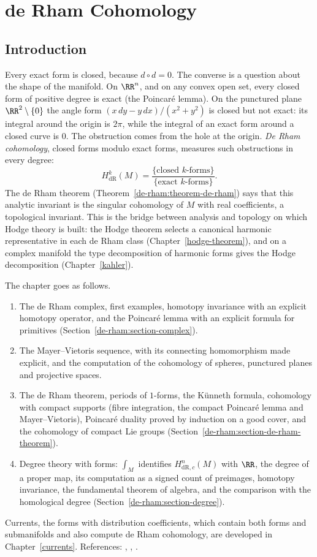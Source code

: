 \chapter{de Rham Cohomology}\label{de-rham}

\section{Introduction}\label{de-rham:section-introduction}

Every exact form is closed, because $d \circ d = 0$. The converse is a question about the shape of the manifold. On $\RR^n$, and on any convex open set, every closed form of
positive degree is exact (the Poincar\'e lemma). On the punctured plane $\RR^2 \setminus \{0\}$ the angle form $(x\,dy - y\,dx)/(x^2 + y^2)$ is closed but not exact: its integral
around the origin is $2\pi$, while the integral of an exact form around a closed curve is $0$. The obstruction comes from the hole at the origin. \emph{De Rham cohomology},
closed forms modulo exact forms, measures such obstructions in every degree:
\[
H^k_{\mathrm{dR}}(M) = \frac{\{\text{closed } k\text{-forms}\}}{\{\text{exact } k\text{-forms}\}} .
\]
The de Rham theorem (Theorem~\ref{de-rham:theorem-de-rham}) says that this analytic invariant is the singular cohomology of $M$ with real coefficients, a topological invariant.
This is the bridge between analysis and topology on which Hodge theory is built: the Hodge theorem selects a canonical harmonic representative in each de Rham class
(Chapter~\ref{hodge-theorem}), and on a complex manifold the type decomposition of harmonic forms gives the Hodge decomposition (Chapter~\ref{kahler}).

The chapter goes as follows.
\begin{enumerate}
\item The de Rham complex, first examples, homotopy invariance with an explicit homotopy operator, and the Poincar\'e lemma with an explicit formula for primitives
(Section~\ref{de-rham:section-complex}).
\item The Mayer--Vietoris sequence, with its connecting homomorphism made explicit, and the computation of the cohomology of spheres, punctured planes and projective spaces.
\item The de Rham theorem, periods of $1$-forms, the K\"unneth formula, cohomology with compact supports (fibre integration, the compact Poincar\'e lemma and Mayer--Vietoris), Poincar\'e duality proved by induction on a good cover,
and the cohomology of compact Lie groups (Section~\ref{de-rham:section-de-rham-theorem}).
\item Degree theory with forms: $\int_M$ identifies $H^n_{\mathrm{dR},c}(M)$ with $\RR$, the degree of a proper map, its computation as a signed count of preimages, homotopy invariance, the fundamental theorem of algebra,
and the comparison with the homological degree (Section~\ref{de-rham:section-degree}).
\end{enumerate}
Currents, the forms with distribution coefficients, which contain both forms and submanifolds and also compute de Rham cohomology, are developed in Chapter~\ref{currents}.
References: \cite{bott-tu}, \cite{warner-foundations}, \cite[Chapter 0]{griffiths-harris}.

